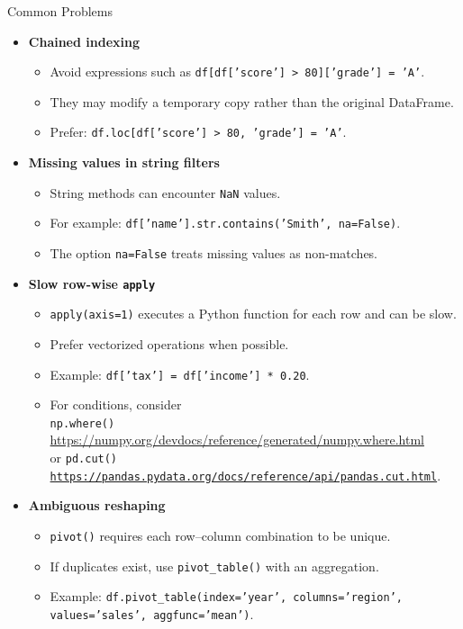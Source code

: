 \documentclass[11pt,aspectratio=43]{beamer}
\begin{document}
\begin{frame}{Common Problems}
  \footnotesize
  \begin{itemize}
    \footnotesize
    \item \textbf{Chained indexing}
    \begin{itemize}
      \tiny
      \item Avoid expressions such as
      \texttt{df[df['score'] > 80]['grade'] = 'A'}.
      \item They may modify a temporary copy rather than the original DataFrame.
      \item Prefer:
      \texttt{df.loc[df['score'] > 80, 'grade'] = 'A'}.
    \end{itemize}

    \item \textbf{Missing values in string filters}
    \begin{itemize}
      \tiny
      \item String methods can encounter \texttt{NaN} values.
      \item For example:
      \texttt{df['name'].str.contains('Smith', na=False)}.
      \item The option \texttt{na=False} treats missing values as non-matches.
    \end{itemize}

    \item \textbf{Slow row-wise \texttt{apply}}
    \begin{itemize}
      \tiny
      \item \texttt{apply(axis=1)} executes a Python function for each row and can be slow.
      \item Prefer vectorized operations when possible.
      \item Example:
      \texttt{df['tax'] = df['income'] * 0.20}.
      \item For conditions, consider \\ \texttt{np.where()} \url{https://numpy.org/devdocs/reference/generated/numpy.where.html} \\
      or \texttt{pd.cut() \url{https://pandas.pydata.org/docs/reference/api/pandas.cut.html}}.
    \end{itemize}

    \item \textbf{Ambiguous reshaping}
    \begin{itemize}
      \tiny
      \item \texttt{pivot()} requires each row--column combination to be unique.
      \item If duplicates exist, use \texttt{pivot\_table()} with an aggregation.
      \item Example:
      \texttt{df.pivot\_table(index='year', columns='region',
      values='sales', aggfunc='mean')}.
    \end{itemize}


\end{itemize}
\end{frame}
\end{document}
